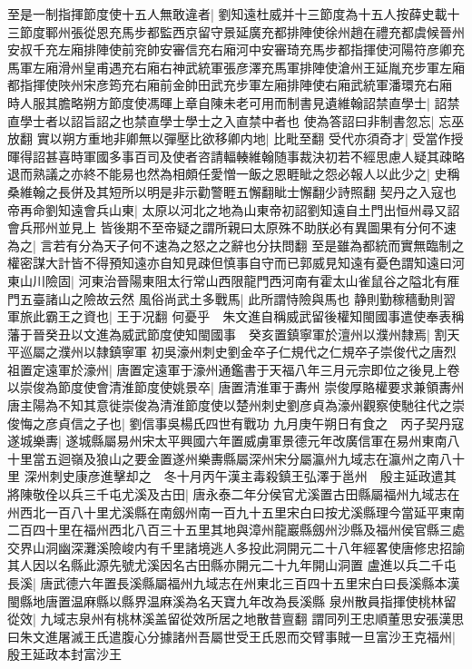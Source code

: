 至是一制指揮節度使十五人無敢違者|{
	劉知遠杜威并十三節度為十五人按薛史載十三節度鄆州張從恩充馬步都監西京留守景延廣充都排陣使徐州趙在禮充都虞候晉州安叔千充左廂排陣使前兖帥安審信充右廂河中安審琦充馬步都指揮使河陽符彦卿充馬軍左廂滑州皇甫遇充右廂右神武統軍張彦澤充馬軍排陣使滄州王延胤充步軍左廂都指揮使陜州宋彦筠充右廂前金帥田武充步軍左廂排陣使右廂武統軍潘環充右廂}
時人服其膽略朔方節度使馮暉上章自陳未老可用而制書見遺維翰詔禁直學士|{
	詔禁直學士者以詔旨詔之也禁直學士學士之入直禁中者也}
使為答詔曰非制書忽忘|{
	忘巫放翻}
實以朔方重地非卿無以彈壓比欲移卿内地|{
	比毗至翻}
受代亦須奇才|{
	受當作授}
暉得詔甚喜時軍國多事百司及使者咨請輻輳維翰随事裁決初若不經思慮人疑其疎略退而熟議之亦終不能易也然為相頗任愛憎一飯之恩睚眦之怨必報人以此少之|{
	史稱桑維翰之長併及其短所以明是非示勸警睚五懈翻眦士懈翻少詩照翻}
契丹之入寇也帝再命劉知遠會兵山東|{
	太原以河北之地為山東帝初詔劉知遠自土門出恒州尋又詔會兵邢州並見上}
皆後期不至帝疑之謂所親曰太原殊不助朕必有異圖果有分何不速為之|{
	言若有分為天子何不速為之怒之之辭也分扶問翻}
至是雖為都統而實無臨制之權密謀大計皆不得預知遠亦自知見疎但慎事自守而已郭威見知遠有憂色謂知遠曰河東山川險固|{
	河東治晉陽東阻太行常山西限龍門西河南有霍太山雀鼠谷之隘北有㕍門五臺諸山之險故云然}
風俗尚武土多戰馬|{
	此所謂恃險與馬也}
静則勤稼穡動則習軍旅此霸王之資也|{
	王于况翻}
何憂乎　朱文進自稱威武留後權知閩國事遣使奉表稱藩于晉癸丑以文進為威武節度使知閩國事　癸亥置鎮寧軍於澶州以濮州隸焉|{
	割天平巡屬之濮州以隸鎮寧軍}
初吳濠州刺史劉金卒子仁規代之仁規卒子崇俊代之唐烈祖置定遠軍於濠州|{
	唐置定遠軍于濠州通鑑書于天福八年三月元宗即位之後見上卷}
以崇俊為節度使會清淮節度使姚景卒|{
	唐置清淮軍于夀州}
崇俊厚賂權要求兼領夀州唐主陽為不知其意徙崇俊為清淮節度使以楚州刺史劉彦貞為濠州觀察使馳往代之崇俊悔之彦貞信之子也|{
	劉信事吳楊氏四世有戰功}
九月庚午朔日有食之　丙子契丹寇遂城樂夀|{
	遂城縣屬易州宋太平興國六年置威虜軍景德元年改廣信軍在易州東南八十里當五迴嶺及狼山之要金置遂州樂夀縣屬深州宋分屬瀛州九域志在瀛州之南八十里}
深州刺史康彦進擊却之　冬十月丙午漢主毒殺鎮王弘澤于邕州　殷主延政遣其將陳敬佺以兵三千屯尤溪及古田|{
	唐永泰二年分侯官尤溪置古田縣屬福州九域志在州西北一百八十里尤溪縣在南劔州南一百九十五里宋白曰按尤溪縣理今當延平東南二百四十里在福州西北八百三十五里其地與漳州龍巖縣劔州沙縣及福州侯官縣三處交界山洞幽深灘溪險峻内有千里諸境逃人多投此洞開元二十八年經畧使唐修忠招諭其人因以名縣此源先號尤溪因名古田縣亦開元二十九年開山洞置}
盧進以兵二千屯長溪|{
	唐武德六年置長溪縣屬福州九域志在州東北三百四十五里宋白曰長溪縣本漢閩縣地唐置温麻縣以縣界温麻溪為名天寶九年改為長溪縣}
泉州散員指揮使桃林留從效|{
	九域志泉州有桃林溪盖留從效所居之地散昔亶翻}
謂同列王忠順董思安張漢思曰朱文進屠滅王氏遣腹心分據諸州吾屬世受王氏恩而交臂事賊一旦富沙王克福州|{
	殷王延政本封富沙王}
